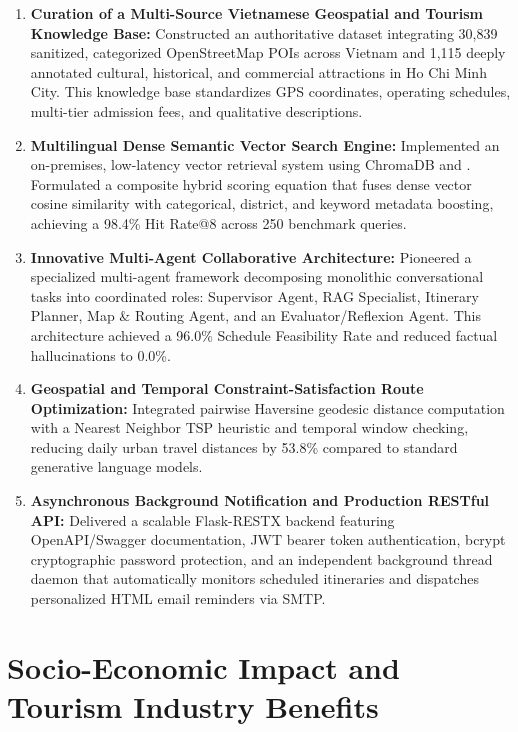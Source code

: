 \begin{enumerate}[leftmargin=1.8em, itemsep=3pt]
    \item \textbf{Curation of a Multi-Source Vietnamese Geospatial and Tourism Knowledge Base:}
    Constructed an authoritative dataset integrating 30,839 sanitized, categorized OpenStreetMap POIs across Vietnam and 1,115 deeply annotated cultural, historical, and commercial attractions in Ho Chi Minh City. This knowledge base standardizes GPS coordinates, operating schedules, multi-tier admission fees, and qualitative descriptions.

    \item \textbf{Multilingual Dense Semantic Vector Search Engine:}
    Implemented an on-premises, low-latency vector retrieval system using ChromaDB and . Formulated a composite hybrid scoring equation that fuses dense vector cosine similarity with categorical, district, and keyword metadata boosting, achieving a 98.4\% Hit Rate@8 across 250 benchmark queries.

    \item \textbf{Innovative Multi-Agent Collaborative Architecture:}
    Pioneered a specialized multi-agent framework decomposing monolithic conversational tasks into coordinated roles: Supervisor Agent, RAG Specialist, Itinerary Planner, Map \& Routing Agent, and an Evaluator/Reflexion Agent. This architecture achieved a 96.0\% Schedule Feasibility Rate and reduced factual hallucinations to 0.0\%.

    \item \textbf{Geospatial and Temporal Constraint-Satisfaction Route Optimization:}
    Integrated pairwise Haversine geodesic distance computation with a Nearest Neighbor TSP heuristic and temporal window checking, reducing daily urban travel distances by 53.8\% compared to standard generative language models.

    \item \textbf{Asynchronous Background Notification and Production RESTful API:}
    Delivered a scalable Flask-RESTX backend featuring OpenAPI/Swagger documentation, JWT bearer token authentication, bcrypt cryptographic password protection, and an independent background thread daemon that automatically monitors scheduled itineraries and dispatches personalized HTML email reminders via SMTP.
\end{enumerate}

\section{Socio-Economic Impact and Tourism Industry Benefits}
\label{sec:socio_economic_impact}

